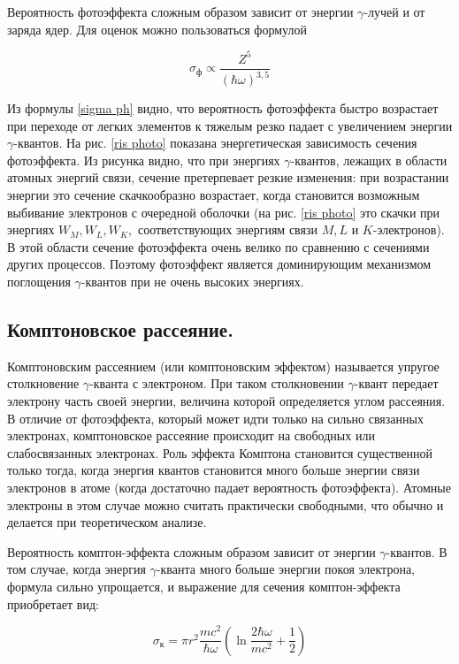\documentclass[a4paper, 12pt]{article}%
\begin{document}
	Вероятность фотоэффекта сложным образом зависит от энергии
	$\gamma$-лучей и от заряда ядер. Для оценок можно пользоваться формулой
	
	\begin{equation}\label{sigma ph}
	\sigma_{\text{ф}} \propto \dfrac{Z^5}{(\hbar\omega)^{3,5}}
	\end{equation}
	
	Из формулы \eqref{sigma ph} видно, что вероятность фотоэффекта быстро возрастает при переходе от легких элементов к тяжелым резко падает с увеличением энергии $\gamma$-квантов. На рис. \ref{ris photo} показана энергетическая зависимость сечения фотоэффекта. Из рисунка видно, что при энергиях $\gamma$-квантов, лежащих в области атомных энергий связи, сечение претерпевает резкие изменения: при возрастании энергии это сечение скачкообразно возрастает, когда становится возможным выбивание электронов с очередной оболочки (на рис. \ref{ris photo} это скачки при энергиях $ W_M, W_L, W_K, $ соответствующих энергиям связи $ M, L $  и $ K $-электронов). В этой области сечение фотоэффекта очень велико по сравнению с сечениями других процессов. Поэтому фотоэффект является доминирующим механизмом поглощения $\gamma$-квантов при не очень высоких энергиях.
	
	\subsection*{Комптоновское рассеяние.} Комптоновским рассеянием (или комптоновским эффектом) называется упругое столкновение $\gamma$-кванта с электроном. При таком столкновении $\gamma$-квант передает электрону часть своей энергии, величина которой определяется углом рассеяния. В отличие от фотоэффекта, который может идти только на сильно связанных электронах, комптоновское рассеяние происходит на свободных или слабосвязанных электронах. Роль эффекта Комптона становится
	существенной только тогда, когда энергия квантов становится много
	больше энергии связи электронов в атоме (когда достаточно падает
	вероятность фотоэффекта). Атомные электроны в этом случае можно
	считать практически свободными, что обычно и делается при теоретическом анализе.
	
	Вероятность комптон-эффекта сложным образом зависит от энергии $\gamma$-квантов. В том случае, когда энергия
	$\gamma$-кванта много больше энергии покоя электрона, формула сильно
	упрощается, и выражение для сечения комптон-эффекта приобретает  вид:
	
	\begin{equation}\label{sigma k}
	\sigma_{\text{к}} = \pi r^2 \dfrac{mc^2}{\hbar\omega} \left( \ln{\dfrac{2\hbar\omega}{mc^2} + \dfrac{1}{2}} \right) 
	\end{equation}
	
\end{document}
